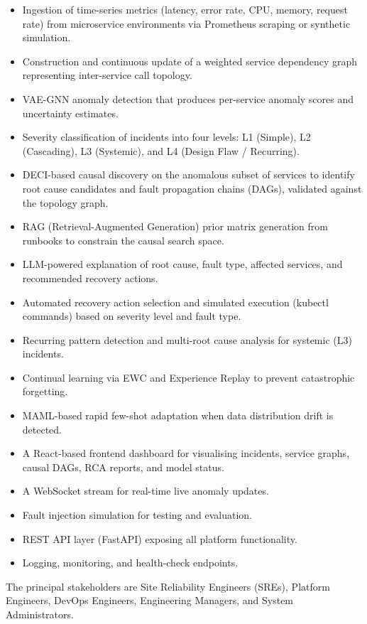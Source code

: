 \documentclass[11pt,a4paper]{article}
\begin{document}
\begin{itemize}
    \item Ingestion of time-series metrics (latency, error rate, CPU, memory, request rate) from microservice environments via Prometheus scraping or synthetic simulation.
    \item Construction and continuous update of a weighted service dependency graph representing inter-service call topology.
    \item VAE-GNN anomaly detection that produces per-service anomaly scores and uncertainty estimates.
    \item Severity classification of incidents into four levels: L1 (Simple), L2 (Cascading), L3 (Systemic), and L4 (Design Flaw / Recurring).
    \item DECI-based causal discovery on the anomalous subset of services to identify root cause candidates and fault propagation chains (DAGs), validated against the topology graph.
    \item RAG (Retrieval-Augmented Generation) prior matrix generation from runbooks to constrain the causal search space.
    \item LLM-powered explanation of root cause, fault type, affected services, and recommended recovery actions.
    \item Automated recovery action selection and simulated execution (kubectl commands) based on severity level and fault type.
    \item Recurring pattern detection and multi-root cause analysis for systemic (L3) incidents.
    \item Continual learning via EWC and Experience Replay to prevent catastrophic forgetting.
    \item MAML-based rapid few-shot adaptation when data distribution drift is detected.
    \item A React-based frontend dashboard for visualising incidents, service graphs, causal DAGs, RCA reports, and model status.
    \item A WebSocket stream for real-time live anomaly updates.
    \item Fault injection simulation for testing and evaluation.
    \item REST API layer (FastAPI) exposing all platform functionality.
    \item Logging, monitoring, and health-check endpoints.
\end{itemize}

The principal stakeholders are Site Reliability Engineers (SREs), Platform Engineers, DevOps Engineers, Engineering Managers, and System Administrators.
\end{document}
